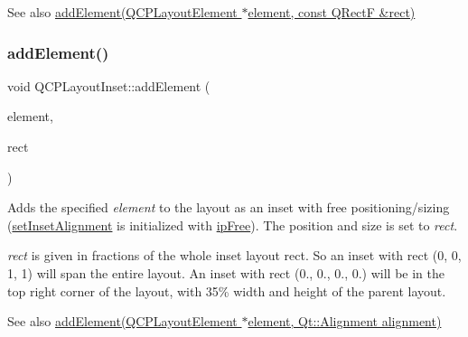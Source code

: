 \begin{DoxySeeAlso}{See also}
\hyperlink{class_q_c_p_layout_inset_a8ff61fbee4a1f0ff45c398009d9f1e56}{add\+Element(\+Q\+C\+P\+Layout\+Element $\ast$element, const Q\+Rect\+F \&rect)} 
\end{DoxySeeAlso}
\mbox{\label{class_q_c_p_layout_inset_a8ff61fbee4a1f0ff45c398009d9f1e56}} 
\subsubsection{\texorpdfstring{add\+Element()}{addElement()}\hspace{0.1cm}{\footnotesize\ttfamily [2/2]}}
{\footnotesize\ttfamily void Q\+C\+P\+Layout\+Inset\+::add\+Element (\begin{DoxyParamCaption}\item[{\hyperlink{class_q_c_p_layout_element}{Q\+C\+P\+Layout\+Element} $\ast$}]{element,  }\item[{const Q\+RectF \&}]{rect }\end{DoxyParamCaption})}

Adds the specified {\itshape element} to the layout as an inset with free positioning/sizing (\hyperlink{class_q_c_p_layout_inset_a62882a4f9ad58bb0f53da12fde022abe}{set\+Inset\+Alignment} is initialized with \hyperlink{class_q_c_p_layout_inset_a8b9e17d9a2768293d2a7d72f5e298192aa4802986ea2cea457f932b115acba59e}{ip\+Free}). The position and size is set to {\itshape rect}.

{\itshape rect} is given in fractions of the whole inset layout rect. So an inset with rect (0, 0, 1, 1) will span the entire layout. An inset with rect (0., 0., 0., 0.) will be in the top right corner of the layout, with 35\% width and height of the parent layout.

\begin{DoxySeeAlso}{See also}
\hyperlink{class_q_c_p_layout_inset_ad61529eb576af7f04dff94abb10c745a}{add\+Element(\+Q\+C\+P\+Layout\+Element $\ast$element, Qt\+::\+Alignment alignment)} 
\end{DoxySeeAlso}
\mbox{\label{class_q_c_p_layout_inset_a881ca205605bae9c034733b808f93a02}} 
